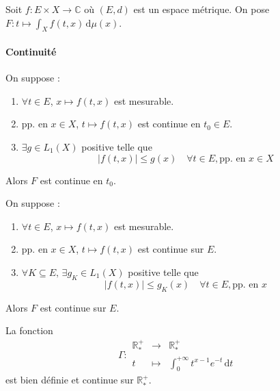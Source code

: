 
  Soit $f : E \times X \rightarrow \mathbb{C}$ où $(E, d)$ est un espace métrique. On pose $F : t \mapsto \int_X f(t, x) \, \mathrm{d}\mu(x)$.

  \paragraph{Continuité}

  \begin{theorem}
    On suppose :
    \begin{enumerate}[label=(\roman*)]
      \item $\forall t \in E$, $x \mapsto f(t,x)$ est mesurable.
      \item pp. en $x \in X$, $t \mapsto f(t,x)$ est continue en $t_0 \in E$.
      \item $\exists g \in L_1(X)$ positive telle que
      \[ |f(t,x)| \leq g(x) \quad \forall t \in E, \text{pp. en } x \in X \]
    \end{enumerate}
    Alors $F$ est continue en $t_0$.
  \end{theorem}

  \begin{corollary}
    On suppose :
    \begin{enumerate}[label=(\roman*)]
      \item $\forall t \in E$, $x \mapsto f(t,x)$ est mesurable.
      \item pp. en $x \in X$, $t \mapsto f(t,x)$ est continue sur $E$.
      \item $\forall K \subseteq E, \, \exists g_K \in L_1(X)$ positive telle que
      \[ |f(t,x)| \leq g_K(x) \quad \forall t \in E, \text{pp. en } x \]
    \end{enumerate}
    Alors $F$ est continue sur $E$.
  \end{corollary}


  \begin{example}
    \label{235-3}
    La fonction
    \[ \Gamma :
    \begin{array}{ccc}
      \mathbb{R}^+_* &\rightarrow& \mathbb{R}^+_* \\
      t &\mapsto& \int_{0}^{+\infty} t^{x-1} e^{-t} \, \mathrm{d}t
    \end{array}
    \]
    est bien définie et continue sur $\mathbb{R}^+_*$.
  \end{example}

